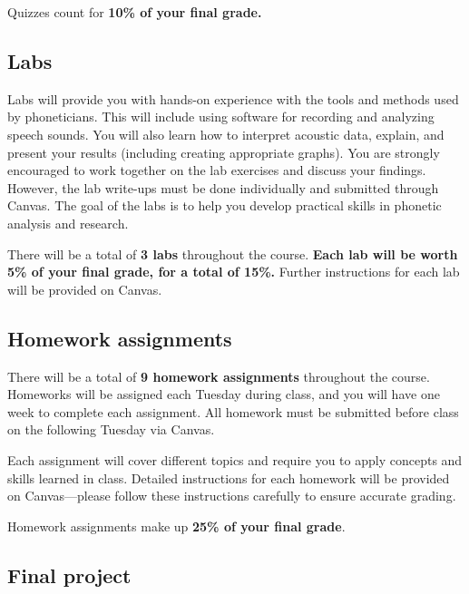 \documentclass[12pt, letterpaper]{article}
\begin{document}
Quizzes count for \textbf{10\% of your final grade.}

\subsection*{Labs} \label{sec:labs}

Labs will provide you with hands-on experience with the tools and methods used by phoneticians. This will include using software for recording and analyzing speech sounds. You will also learn how to interpret acoustic data, explain, and present your results (including creating appropriate graphs). You are strongly encouraged to work together on the lab exercises and discuss your findings. However, the lab write-ups must be done individually and submitted through Canvas. The goal of the labs is to help you develop practical skills in phonetic analysis and research.

There will be a total of \textbf{3 labs} throughout the course. \textbf{Each lab will be worth 5\% of your final grade, for a total of 15\%.} Further instructions for each lab will be provided on Canvas.

\subsection*{Homework assignments} \label{sec:homework}

There will be a total of \textbf{9 homework assignments} throughout the course. Homeworks will be assigned each Tuesday during class, and you will have one week to complete each assignment. All homework must be submitted before class on the following Tuesday via Canvas.

Each assignment will cover different topics and require you to apply concepts and skills learned in class. Detailed instructions for each homework will be provided on Canvas—please follow these instructions carefully to ensure accurate grading.

Homework assignments make up \textbf{25\% of your final grade}.


\subsection*{Final project} \label{sec:course_assignment6}
\end{document}
